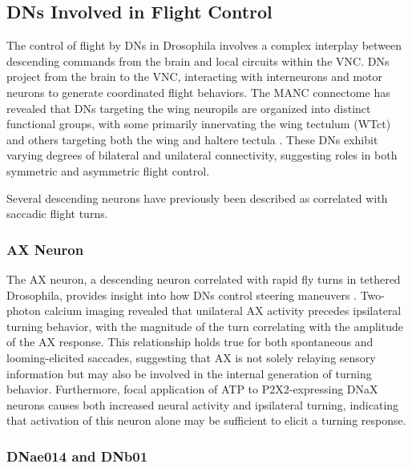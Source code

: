 \documentclass[../main/thesis_msc.tex]{subfiles}
\begin{document}
	\subsection{DNs Involved in Flight Control}

	The control of flight by DNs in Drosophila involves a complex interplay between descending commands from the brain and local circuits within the VNC. DNs project from the brain to the VNC, interacting with interneurons and motor neurons to generate coordinated flight behaviors. The MANC connectome has revealed that DNs targeting the wing neuropils are organized into distinct functional groups, with some primarily innervating the wing tectulum (WTct) and others targeting both the wing and haltere tectula \autocite{cheong_transforming_2024}. These DNs exhibit varying degrees of bilateral and unilateral connectivity, suggesting roles in both symmetric and asymmetric flight control.

	Several descending neurons have previously been described as correlated with saccadic flight turns. 

	\subsubsection{AX Neuron}

	The AX neuron, a descending neuron correlated with rapid fly turns in tethered Drosophila, provides insight into how DNs control steering maneuvers \autocite{schnell_descending_2017}. Two-photon calcium imaging revealed that unilateral AX activity precedes ipsilateral turning behavior, with the magnitude of the turn correlating with the amplitude of the AX response. This relationship holds true for both spontaneous and looming-elicited saccades, suggesting that AX is not solely relaying sensory information but may also be involved in the internal generation of turning behavior. Furthermore, focal application of ATP to P2X2-expressing DNaX neurons causes both increased neural activity and ipsilateral turning, indicating that activation of this neuron alone may be sufficient to elicit a turning response.

	\subsubsection{DNae014 and DNb01}
\end{document}
